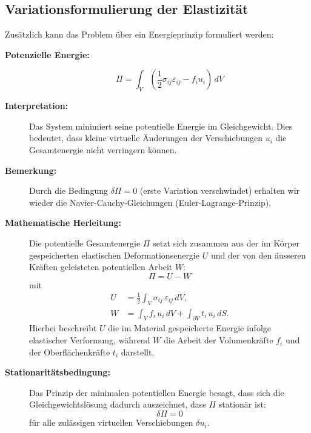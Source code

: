 \subsection{Variationsformulierung der Elastizität}
Zusätzlich kann das Problem über ein Energieprinzip formuliert werden:

\begin{description}
	\item[\textbf{Potenzielle Energie:}]
	\begin{equation*}
		\Pi = \int_V \left( \frac{1}{2} \sigma_{ij} \varepsilon_{ij} - f_i u_i \right) \, dV
	\end{equation*}
	
	\item[\textbf{Interpretation:}] 
	Das System minimiert seine potentielle Energie im Gleichgewicht. 
	Dies bedeutet, dass kleine virtuelle Änderungen der
	Verschiebungen $u_i$ die Gesamtenergie nicht verringern
	können.
	
	\item[\textbf{Bemerkung:}] 
	Durch die Bedingung $\delta \Pi = 0$ (erste Variation
	verschwindet) erhalten wir wieder die Navier-Cauchy-Gleichungen
	(Euler-Lagrange-Prinzip).
	
	\item[\textbf{Mathematische Herleitung:}] 
	Die potentielle Gesamtenergie $\Pi$ setzt sich zusammen aus
	der im Körper gespeicherten elastischen Deformationsenergie
	$U$ und der von den äusseren Kräften geleisteten potentiellen
	Arbeit $W$:
	\begin{equation*}
		\Pi = U - W
	\end{equation*}
	mit
	\begin{align*}
		U &= \frac{1}{2} \int_V \sigma_{ij} \, \varepsilon_{ij} \, dV, \\
		W &= \int_V f_i \, u_i \, dV + \int_{\partial V} t_i \, u_i \, dS.
	\end{align*}
	Hierbei beschreibt $U$ die im Material gespeicherte Energie
	infolge elastischer Verformung, während $W$ die Arbeit der
	Volumenkräfte $f_i$ und der Oberflächenkräfte $t_i$ darstellt.
	
	\item[\textbf{Stationaritätsbedingung:}]
	Das Prinzip der minimalen potentiellen Energie besagt, dass
	sich die Gleichgewichtslösung dadurch auszeichnet, dass
	$\Pi$ stationär ist:
	\begin{equation*}
		\delta \Pi = 0
	\end{equation*}
	für alle zulässigen virtuellen Verschiebungen $\delta u_i$.
	

\end{description}
